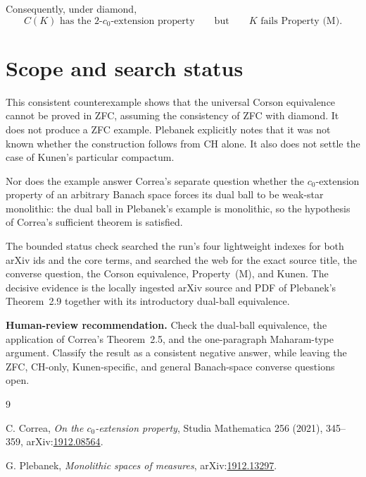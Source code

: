\documentclass[11pt]{article}
\newcommand{\cEP}{\(c_0\)-extension property}
\begin{document}
Consequently, under diamond,
\[
 C(K)\text{ has the }2\text{-}c_0\text{-extension property}
 \qquad\text{but}\qquad
 K\text{ fails Property (M)}.
\]

\section*{Scope and search status}

This consistent counterexample shows that the universal Corson equivalence
cannot be proved in ZFC, assuming the consistency of ZFC with diamond.  It
does not produce a ZFC example.  Plebanek explicitly notes that it was not
known whether the construction follows from CH alone.  It also does not
settle the case of Kunen's particular compactum.

Nor does the example answer Correa's separate question whether the
\cEP{} of an arbitrary Banach space forces its dual ball
to be weak-star monolithic: the dual ball in Plebanek's example is
monolithic, so the hypothesis of Correa's sufficient theorem is satisfied.

The bounded status check searched the run's four lightweight indexes for both
arXiv ids and the core terms, and searched the web for the exact source title,
the converse question, the Corson equivalence, Property~(M), and Kunen.  The
decisive evidence is the locally ingested arXiv source and PDF of
Plebanek's Theorem~2.9 together with its introductory dual-ball equivalence.

\textbf{Human-review recommendation.} Check the dual-ball equivalence, the
application of Correa's Theorem~2.5, and the one-paragraph Maharam-type
argument.  Classify the result as a consistent negative answer, while leaving
the ZFC, CH-only, Kunen-specific, and general Banach-space converse questions
open.

\begin{thebibliography}{9}

C. Correa,
\emph{On the \(c_0\)-extension property},
Studia Mathematica 256 (2021), 345--359,
arXiv:\href{https://arxiv.org/abs/1912.08564}{1912.08564}.

G. Plebanek,
\emph{Monolithic spaces of measures},
arXiv:\href{https://arxiv.org/abs/1912.13297}{1912.13297}.

\end{thebibliography}
\end{document}
